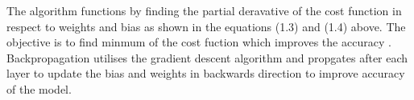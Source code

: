 The algorithm functions by finding the 
partial deravative of the cost function in respect to weights and bias as shown in the equations (1.3) and  (1.4) above.
The objective is to find minmum of the cost fuction which improves the accuracy \citep{7013173}. 
Backpropagation utilises the gradient descent algorithm and propgates after each layer to 
update the bias and weights in backwards direction to improve accuracy of the model.
